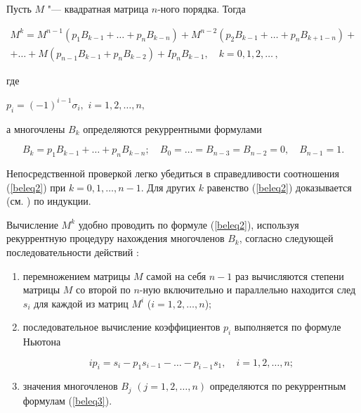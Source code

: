 \begin{theorem}

Пусть $M$ "--- квадратная матрица $n$-ного порядка. Тогда 

\begin{multline}

M^k=M^{n-1}(p_1B_{k-1} +  \dots  + p_nB_{k-n})+M^{n-2}(p_2B_{k-1} +  \dots  + p_nB_{k+1-n}) + \\ +  \dots  

+M(p_{n-1}B_{k-1}+p_nB_{k-2})+Ip_nB_{k-1},\quad k=0, 1, 2,  \dots \,,\label{beleq2}	

\end{multline}

где 

$p_i=(-1)^{i-1}\sigma_i,$ $i=1, 2,  \dots , n,	$

а многочлены $B_k$ определяются рекуррентными формулами

\begin{equation}

\label{beleq3}

B_k=p_1B_{k-1}+ \dots +p_nB_{k-n};\quad B_0= \dots =B_{n-3}=B_{n-2}=0,\quad   B_{n-1}=1.

\end{equation}

\end{theorem}



\smallskip



Непосредственной проверкой  легко убедиться в справедливости соотношения  (\ref{beleq2}) при  $k = 0, 1, \dots, n - 1$. Для других $k$ равенство (\ref{beleq2}) доказывается (см. \cite[стр.\,63]{belyayev:Belyayev1}) по индукции.



\smallskip




Вычисление $M^k$  удобно проводить по формуле (\ref{beleq2}), используя рекуррентную процедуру нахождения многочленов $B_k$, согласно следующей последовательности действий \cite{belyayev:Belyayev2}:

\begin{enumerate}

\item перемножением матрицы $M$ самой на себя $n-1$ раз вычисляются степени матрицы $M$ со второй по $n$-ную включительно и параллельно находится след $s_i$ для каждой из матриц $M^i$ ($i=1, 2, \dots, n$);



\item последовательное  вычисление коэффициентов $p_i$ выполняется по формуле Ньютона 

$$ip_i=s_i-p_1s_{i-1}- \dots -p_{i-1}s_1,\quad   i=1, 2, \dots , n;$$



\item значения многочленов $B_j$ $(j=1, 2, \dots, n)$ определяются по рекуррентным формулам (\ref{beleq3}).

\end{enumerate}




